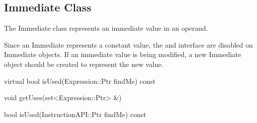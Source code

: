 \subsection{Immediate Class}
\label{sec:immediate}

The Immediate class represents an immediate value in an operand.

Since an Immediate represents a constant value, the  and
 interface are disabled on Immediate objects. If an immediate
value is being modified, a new Immediate object should be created to represent
the new value. 

\begin{apient}
virtual bool isUsed(Expression::Ptr findMe) const
\end{apient}

\begin{apient}
void getUses(set<Expression::Ptr> &)
\end{apient}

\begin{apient}
bool isUsed(InstructionAPI::Ptr findMe) const
\end{apient}

